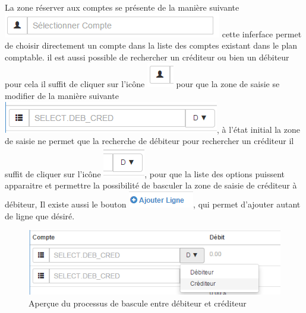 \documentclass[12pt,a4paper]{report}
\begin{document}
La zone réserver aux comptes se présente de la manière suivante
\\
\includegraphics[scale=0.7]{pic/SelectCompte.png} cette inferface permet de choisir directement un compte dans la liste des comptes existant dans le plan comptable. il est aussi possible de rechercher un créditeur ou bien un débiteur pour cela il suffit de cliquer sur l'icône \includegraphics[scale=0.7]{pic/SelectCompteIcone.png} pour que la zone de saisie se modifier de la manière suivante \includegraphics[scale=0.7]{pic/SelectDebCred.png}, à l'état initial la zone de saisie ne permet que la recherche de débiteur pour rechercher un créditeur il suffit de cliquer sur l'icône \includegraphics[scale=0.7]{pic/DebToCred.png}, pour que la liste des options puissent apparaitre et permettre la possibilité de basculer la zone de saisie de créditeur à débiteur, Il existe aussi le bouton \includegraphics[scale=0.7]{pic/AjouterLigne.png}, qui permet d'ajouter autant de ligne que désiré.

\begin{figure}[h]
\begin{center}
\includegraphics[width=12cm]{pic/SelectCredit.png}
\end{center}
\caption{Aperçue du processus de bascule entre débiteur et créditeur}
\label{Aperçue du processus de bascule entre débiteur et créditeur}
\end{figure}
\end{document}
